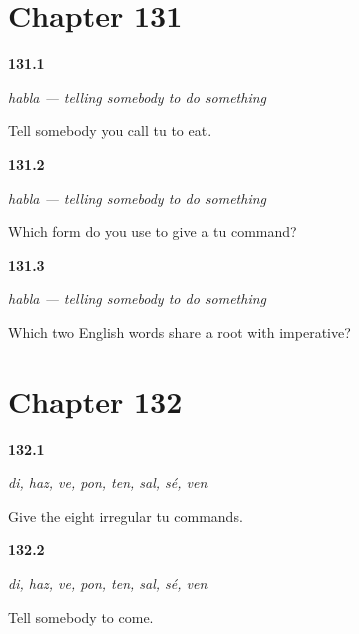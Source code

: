\section*{Chapter 131}

\noindent\begin{minipage}[t]{\linewidth}
\raggedright
\hypertarget{review-ES-C50-habla-say}{\textbf{131.1}} \emph{habla — telling somebody to do something}\par
\small Tell somebody you call tu to eat.
\end{minipage}\par\medskip

\noindent\begin{minipage}[t]{\linewidth}
\raggedright
\hypertarget{review-ES-C50-habla-rule}{\textbf{131.2}} \emph{habla — telling somebody to do something}\par
\small Which form do you use to give a tu command?
\end{minipage}\par\medskip

\noindent\begin{minipage}[t]{\linewidth}
\raggedright
\hypertarget{review-ES-C50-habla-emperor}{\textbf{131.3}} \emph{habla — telling somebody to do something}\par
\small Which two English words share a root with imperative?
\end{minipage}\par\medskip

\section*{Chapter 132}

\noindent\begin{minipage}[t]{\linewidth}
\raggedright
\hypertarget{review-ES-C50-ocho-cortos-list}{\textbf{132.1}} \emph{di, haz, ve, pon, ten, sal, sé, ven}\par
\small Give the eight irregular tu commands.
\end{minipage}\par\medskip

\noindent\begin{minipage}[t]{\linewidth}
\raggedright
\hypertarget{review-ES-C50-ocho-cortos-come}{\textbf{132.2}} \emph{di, haz, ve, pon, ten, sal, sé, ven}\par
\small Tell somebody to come.
\end{minipage}\par\medskip

